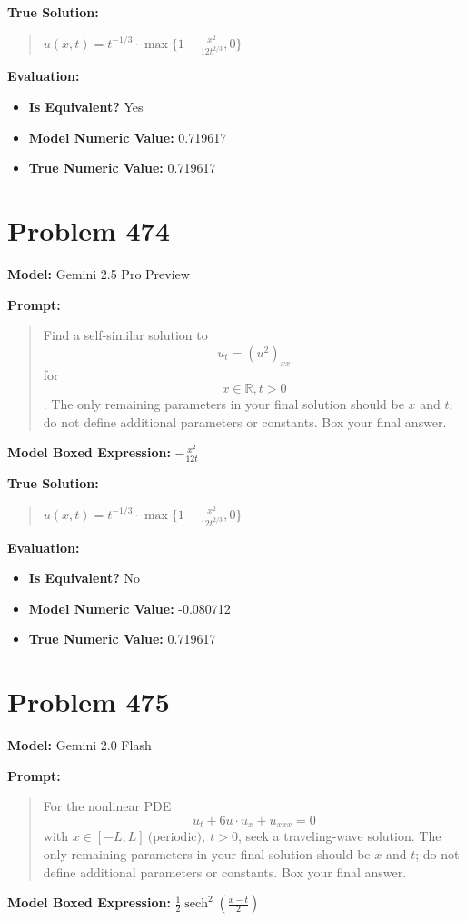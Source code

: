 \documentclass{article}
\begin{document}
\textbf{True Solution:}
\begin{quote}
$u(x,t)=t^{-1/3}\cdot\max\{1-\frac{x^2}{12t^{2/3}},0\}$
\end{quote}

\textbf{Evaluation:}
\begin{itemize}
\item \textbf{Is Equivalent?} Yes
\item \textbf{Model Numeric Value:} 0.719617
\item \textbf{True Numeric Value:} 0.719617
\end{itemize}
\vspace{1cm}
\section*{Problem 474}
\textbf{Model:} Gemini 2.5 Pro Preview

\textbf{Prompt:}
\begin{quote}
Find a self-similar solution to $$u_t=(u^2)_{xx}$$ for $$x\in \mathbb{R}, t>0$$. The only remaining parameters in your final solution should be $x$ and $t$; do not define additional parameters or constants. Box your final answer.
\end{quote}
\textbf{Model Boxed Expression:} $-\frac{x^2}{12t}$

\textbf{True Solution:}
\begin{quote}
$u(x,t)=t^{-1/3}\cdot\max\{1-\frac{x^2}{12t^{2/3}},0\}$
\end{quote}

\textbf{Evaluation:}
\begin{itemize}
\item \textbf{Is Equivalent?} No
\item \textbf{Model Numeric Value:} -0.080712
\item \textbf{True Numeric Value:} 0.719617
\end{itemize}
\vspace{1cm}
\section*{Problem 475}
\textbf{Model:} Gemini 2.0 Flash

\textbf{Prompt:}
\begin{quote}
For the nonlinear PDE $$u_t + 6u\cdot u_x + u_{xxx} = 0$$ with $x\in [-L,L] \ \text{(periodic)}, \ t>0$, seek a traveling‐wave solution. The only remaining parameters in your final solution should be $x$ and $t$; do not define additional parameters or constants. Box your final answer.
\end{quote}
\textbf{Model Boxed Expression:} $\frac{1}{2}\operatorname{sech}^2\left(\frac{x-t}{2}\right)$
\end{document}
